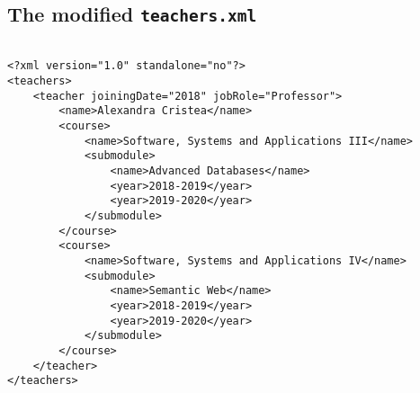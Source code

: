 \documentclass[11pt]{article} %
\begin{document}
\clearpage
\subsection*{The modified \texttt{teachers.xml}}


\begin{verbatim}

<?xml version="1.0" standalone="no"?>
<teachers>
    <teacher joiningDate="2018" jobRole="Professor">
        <name>Alexandra Cristea</name>
        <course>
            <name>Software, Systems and Applications III</name>
            <submodule>
                <name>Advanced Databases</name>
                <year>2018-2019</year>
                <year>2019-2020</year>
            </submodule>
        </course>
        <course>
            <name>Software, Systems and Applications IV</name>
            <submodule>
                <name>Semantic Web</name>
                <year>2018-2019</year>
                <year>2019-2020</year>
            </submodule>
        </course>
    </teacher>
</teachers>

\end{verbatim}
\end{document}
